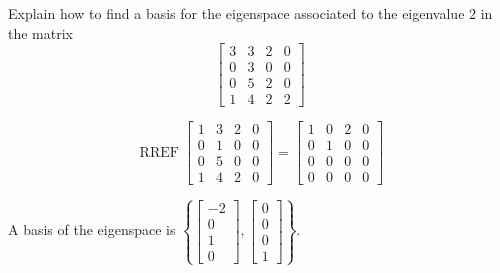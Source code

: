 
\begin{exerciseStatement}


Explain how to find a basis for the eigenspace associated to the eigenvalue \( 2 \) in the matrix \[ \left[\begin{array}{cccc}
3 & 3 & 2 & 0 \\
0 & 3 & 0 & 0 \\
0 & 5 & 2 & 0 \\
1 & 4 & 2 & 2
\end{array}\right] \]


\end{exerciseStatement}
    
\begin{exerciseAnswer} 


\[\operatorname{RREF} \left[\begin{array}{cccc}
1 & 3 & 2 & 0 \\
0 & 1 & 0 & 0 \\
0 & 5 & 0 & 0 \\
1 & 4 & 2 & 0
\end{array}\right] = \left[\begin{array}{cccc}
1 & 0 & 2 & 0 \\
0 & 1 & 0 & 0 \\
0 & 0 & 0 & 0 \\
0 & 0 & 0 & 0
\end{array}\right] \]



A basis of the eigenspace is \( \left\{ \left[\begin{array}{c}
-2 \\
0 \\
1 \\
0
\end{array}\right] , \left[\begin{array}{c}
0 \\
0 \\
0 \\
1
\end{array}\right] \right\} \).


\end{exerciseAnswer}
    
